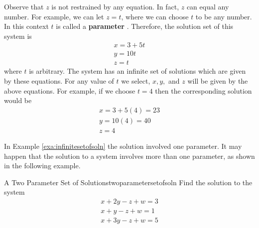 \begin{solution}
Observe that $z$ is not restrained by any equation. In fact,
 $z$ can equal any number. For example, we can let $z = t$, where we can choose $t$ to be any number.
In this context $t$ is called a \textbf{parameter} . Therefore, the solution
set of this system is 
\[
\begin{array}{c}
x=3+5t \\
y=10t \\
z=t
\end{array}
\]
where $t$ is arbitrary. The system has an infinite set of solutions which are given by these equations. For any value of $t$ we select,
$x, y,$ and $z$ will be given by the above equations. For example, if we choose $t=4$ then the corresponding solution would be 
\[
\begin{array}{c}
x = 3 + 5 (4) = 23\\
y = 10(4)=40 \\
z=4
\end{array}
\]
\end{solution}

In Example \ref{exa:infinitesetofsoln} the solution involved one parameter. It may happen that the solution
to a system involves more than one parameter, as shown in the following example.

\begin{example}{A Two Parameter Set of Solutions}{twoparametersetofsoln}
Find the solution to the system
\begin{equation*}
\begin{array}{c}
x+2y-z+w=3 \\
x+y-z+w=1 \\
x+3y-z+w=5
\end{array}
\end{equation*}
\end{example}


